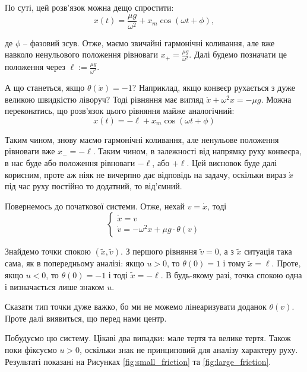 \documentclass[oneside,solution]{tmpl}
\begin{document}
По суті, цей розв'язок можна дещо спростити:
\begin{equation}
    x(t) = \frac{\mu g}{\omega^2} + x_m \cos(\omega t + \phi),
\end{equation}

де $\phi$ -- фазовий зсув. Отже, маємо звичайні гармонічні коливання, але вже навколо ненульового положення рівноваги $x_+=\frac{\mu g}{\omega^2}$. Далі будемо позначати це положення через $\ell := \frac{\mu g}{\omega^2}$.

А що станеться, якщо $\theta(\dot{x})=-1$? Наприклад, якщо конвеєр рухається з дуже великою швидкістю ліворуч? Тоді рівняння має вигляд $\ddot{x} +\omega^2 x = -\mu g$. Можна переконатись, що розв'язок цього рівняння майже аналогічний:
\begin{equation}
    x(t) = -\ell + x_m \cos (\omega t + \phi)
\end{equation}

Таким чином, знову маємо гармонічні коливання, але ненульове положення рівноваги вже $x_- = -\ell$. Таким чином, в залежності від напрямку руху конвеєра, в нас буде або положення рівноваги $-\ell$, або $+\ell$. Цей висновок буде далі корисним, проте аж ніяк не вичерпно дає відповідь на задачу, оскільки вираз $\dot{x}$ під час руху постійно то додатний, то від'ємний. 

Повернемось до початкової системи. Отже, нехай $v=\dot{x}$, тоді
\begin{equation}
    \begin{cases}
        \dot{x} = v \\
        \dot{v} = -\omega^2 x + \mu g \cdot \theta(v)
    \end{cases}
\end{equation}

Знайдемо точки спокою $(\widetilde{x},\widetilde{v})$. З першого рівняння $\widetilde{v}=0$, а з $\widetilde{x}$ ситуація така сама, як в попередньому аналізі: якщо $u>0$, то $\theta(0)=1$ і тому $\widetilde{x}=\ell$. Проте, якщо $u < 0$, то $\theta(0)=-1$ і тоді $\widetilde{x} = -\ell$. В будь-якому разі, точка спокою одна і визначається лише знаком $u$. 

Сказати тип точки дуже важко, бо ми не можемо лінеаризувати доданок $\theta(v)$. Проте далі виявиться, що перед нами центр.

Побудуємо цю систему. Цікаві два випадки: мале тертя та велике тертя. Також поки фіксуємо $u>0$, оскільки знак не принциповий для аналізу характеру руху. Результаті показані на Рисунках \ref{fig:small_friction} та \ref{fig:large_friction}.
\end{document}
